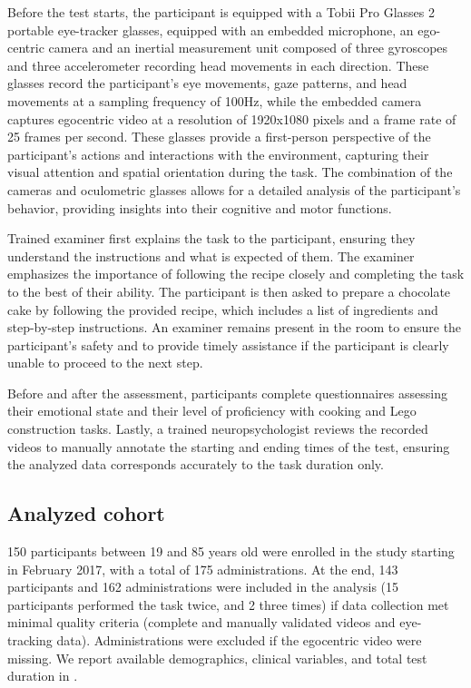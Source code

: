 Before the test starts, the participant is equipped with a Tobii Pro Glasses 2 portable eye-tracker glasses, equipped with an embedded microphone, an ego-centric camera and an inertial measurement unit composed of three gyroscopes and three accelerometer recording head movements in each direction. These glasses record the participant's eye movements, gaze patterns, and head movements at a sampling frequency of 100Hz, while the embedded camera captures egocentric video at a resolution of 1920x1080 pixels and a frame rate of 25 frames per second. These glasses provide a first-person perspective of the participant's actions and interactions with the environment, capturing their visual attention and spatial orientation during the task. The combination of the cameras and oculometric glasses allows for a detailed analysis of the participant's behavior, providing insights into their cognitive and motor functions.

Trained examiner first explains the task to the participant, ensuring they understand the instructions and what is expected of them. The examiner emphasizes the importance of following the recipe closely and completing the task to the best of their ability. The participant is then asked to prepare a chocolate cake by following the provided recipe, which includes a list of ingredients and step-by-step instructions. An examiner remains present in the room to ensure the participant’s safety and to provide timely assistance if the participant is clearly unable to proceed to the next step.

Before and after the assessment, participants complete questionnaires assessing their emotional state and their level of proficiency with cooking and Lego construction tasks.
Lastly, a trained neuropsychologist reviews the recorded videos to manually annotate the starting and ending times of the test, ensuring the analyzed data corresponds accurately to the task duration only.


\subsection{Analyzed cohort}
\label{sec:chapter_4_analyzed_cohort}  
150 participants between 19 and 85 years old were enrolled in the study starting in February 2017, with a total of 175 administrations. At the end, 143 participants and 162 administrations were included in the analysis (15 participants performed the task twice, and 2 three times) if data collection met minimal quality criteria (complete and manually validated videos and eye-tracking data). Administrations were excluded if the egocentric video were missing. We report available demographics, clinical variables, and total test duration in . %

